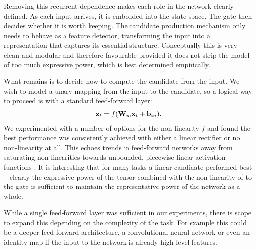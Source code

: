 Removing this recurrent dependence makes each role in the network clearly defined. As each input arrives, it is
embedded into the state space. The gate then decides whether it is worth keeping.
The candidate production mechanism only needs to behave as a feature
detector, transforming the input into a representation that captures its essential structure.
Conceptually this is very clean and modular and therefore favourable provided it does not strip
the model of too much expressive power, which is best determined empirically.
%

What remains is to decide how to compute the candidate from the input. We wish to model a unary
mapping from the input to the candidate, so a logical way to proceed is with a standard feed-forward
layer:
\begin{equation}\label{eq:propcandidate}
	\mathbf{z}_t = f(\mathbf{W}_{in}\mathbf{x}_t + \mathbf{b}_{in}).
\end{equation} We experimented with a number of options for the non-linearity \(f\) and found the best
performance was consistently achieved with either a linear rectifier or no
non-linearity at all. This echoes trends in feed-forward networks away from saturating non-linearities
towards unbounded, piecewise linear activation functions \autocite{Goodfellow2013, He}. It is
interesting that for many tasks a linear candidate performed best -- clearly the
expressive power of the tensor combined with the non-linearity of to the gate is sufficient to
maintain the representative power of the network as a whole.

While a single feed-forward layer was sufficient in our experiments, there is scope to expand this
depending on the complexity of the task. For example this could be a deeper feed-forward architecture,
a convolutional neural network or even an identity map if the
input to the network is already high-level features.

